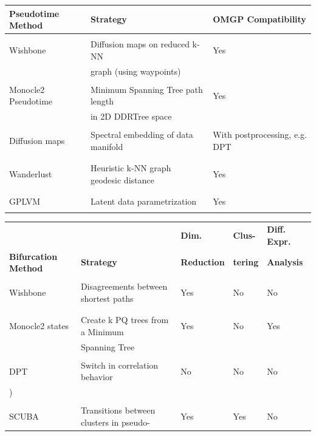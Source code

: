 \begin{table}
\centering
\begin{tabularx}{0.8\textwidth}{lll}
\textbf{Pseudotime Method} & \textbf{Strategy} & \textbf{OMGP Compatibility} \\
\hline \\ 
Wishbone & Diffusion maps on reduced k-NN & Yes \\
\cite{Setty2016-ie} & graph (using waypoints) & \\ & & \\
Monocle2 Pseudotime &  Minimum Spanning Tree path length & Yes \\
\cite{Trapnell2014-cn} & in 2D DDRTree space &  \\ & &  \\
Diffusion maps & Spectral embedding of data manifold & With postprocessing, e.g. DPT \\
\cite{Haghverdi2015-ig} & & \cite{Haghverdi2016-tm} \\ & & \\
Wanderlust & Heuristic k-NN graph geodesic distance & Yes \\
\cite{Bendall2014-kg} & & \\ & & \\
GPLVM & Latent data parametrization & Yes  \\ & & \\
\end{tabularx}
\begin{tabularx}{0.95\textwidth}{lllll}
 &  & \textbf{Dim. } & \textbf{Clus-} & \textbf{Diff. Expr.} \\
\textbf{Bifurcation Method} & \textbf{Strategy} & \textbf{Reduction} & \textbf{tering} & \textbf{Analysis} \\
\hline \\
Wishbone & Disagreements between shortest paths & Yes & No & No \\
\cite{Bendall2014-kg} & & & & \\ & & & &\\
Monocle2 states & Create k PQ trees from a Minimum & Yes & No & Yes \\
\cite{Trapnell2014-cn} & Spanning Tree & & & \\ & & & &\\
DPT & Switch in correlation behavior & No & No & No \\
\cite{Haghverdi2016-tm}) & & & & \\  & & & & \\
SCUBA & Transitions between clusters in pseudo-& Yes & Yes & No \\

\end{tabularx}
\end{table}
